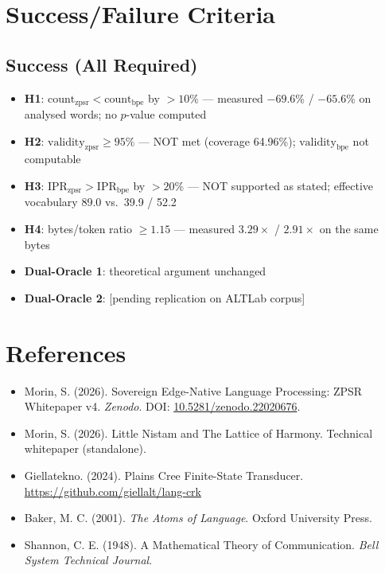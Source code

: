 \documentclass[11pt,oneside]{article}
\begin{document}
\section{Success/Failure Criteria}

\subsection{Success (All Required)}

\begin{itemize}
  \item \textbf{H1}: $\text{count}_{\text{zpsr}} < \text{count}_{\text{bpe}}$ by $>10\%$ --- measured $-69.6\%$ / $-65.6\%$ on analysed words; no $p$-value computed
  \item \textbf{H2}: $\text{validity}_{\text{zpsr}} \geq 95\%$ --- NOT met (coverage 64.96\%); $\text{validity}_{\text{bpe}}$ not computable
  \item \textbf{H3}: $\text{IPR}_{\text{zpsr}} > \text{IPR}_{\text{bpe}}$ by $>20\%$ --- NOT supported as stated; effective vocabulary 89.0 vs.\ 39.9 / 52.2
  \item \textbf{H4}: bytes/token ratio $\geq 1.15$ --- measured $3.29\times$ / $2.91\times$ on the same bytes
  \item \textbf{Dual-Oracle 1}: theoretical argument unchanged
  \item \textbf{Dual-Oracle 2}: [pending replication on ALTLab corpus]
\end{itemize}

\section{References}

\begin{itemize}
  \item Morin, S. (2026). Sovereign Edge-Native Language Processing: ZPSR Whitepaper v4. \emph{Zenodo}. DOI: \href{https://doi.org/10.5281/zenodo.22020676}{10.5281/zenodo.22020676}.
  \item Morin, S. (2026). Little Nistam and The Lattice of Harmony. Technical whitepaper (standalone).
  \item Giellatekno. (2024). Plains Cree Finite-State Transducer. \url{https://github.com/giellalt/lang-crk}
  \item Baker, M. C. (2001). \emph{The Atoms of Language}. Oxford University Press.
  \item Shannon, C. E. (1948). A Mathematical Theory of Communication. \emph{Bell System Technical Journal}.
\end{itemize}
\end{document}
